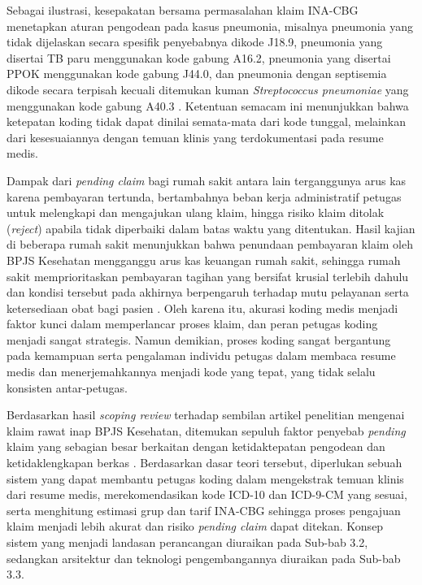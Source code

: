 Sebagai ilustrasi, kesepakatan bersama permasalahan klaim INA-CBG menetapkan aturan pengodean pada kasus pneumonia, misalnya pneumonia yang tidak dijelaskan secara spesifik penyebabnya dikode J18.9, pneumonia yang disertai TB paru menggunakan kode gabung A16.2, pneumonia yang disertai PPOK menggunakan kode gabung J44.0, dan pneumonia dengan septisemia dikode secara terpisah kecuali ditemukan kuman \textit{Streptococcus pneumoniae} yang menggunakan kode gabung A40.3 \cite{10}. Ketentuan semacam ini menunjukkan bahwa ketepatan koding tidak dapat dinilai semata-mata dari kode tunggal, melainkan dari kesesuaiannya dengan temuan klinis yang terdokumentasi pada resume medis.

Dampak dari \textit{pending claim} bagi rumah sakit antara lain terganggunya arus kas karena pembayaran tertunda, bertambahnya beban kerja administratif petugas untuk melengkapi dan mengajukan ulang klaim, hingga risiko klaim ditolak (\textit{reject}) apabila tidak diperbaiki dalam batas waktu yang ditentukan. Hasil kajian di beberapa rumah sakit menunjukkan bahwa penundaan pembayaran klaim oleh BPJS Kesehatan mengganggu arus kas keuangan rumah sakit, sehingga rumah sakit memprioritaskan pembayaran tagihan yang bersifat krusial terlebih dahulu dan kondisi tersebut pada akhirnya berpengaruh terhadap mutu pelayanan serta ketersediaan obat bagi pasien \cite{10}. Oleh karena itu, akurasi koding medis menjadi faktor kunci dalam memperlancar proses klaim, dan peran petugas koding menjadi sangat strategis. Namun demikian, proses koding sangat bergantung pada kemampuan serta pengalaman individu petugas dalam membaca resume medis dan menerjemahkannya menjadi kode yang tepat, yang tidak selalu konsisten antar-petugas.

Berdasarkan hasil \textit{scoping review} terhadap sembilan artikel penelitian mengenai klaim rawat inap BPJS Kesehatan, ditemukan sepuluh faktor penyebab \textit{pending} klaim yang sebagian besar berkaitan dengan ketidaktepatan pengodean dan ketidaklengkapan berkas \cite{10}. Berdasarkan dasar teori tersebut, diperlukan sebuah sistem yang dapat membantu petugas koding dalam mengekstrak temuan klinis dari resume medis, merekomendasikan kode ICD-10 dan ICD-9-CM yang sesuai, serta menghitung estimasi grup dan tarif INA-CBG sehingga proses pengajuan klaim menjadi lebih akurat dan risiko \textit{pending claim} dapat ditekan. Konsep sistem yang menjadi landasan perancangan diuraikan pada Sub-bab 3.2, sedangkan arsitektur dan teknologi pengembangannya diuraikan pada Sub-bab 3.3.

